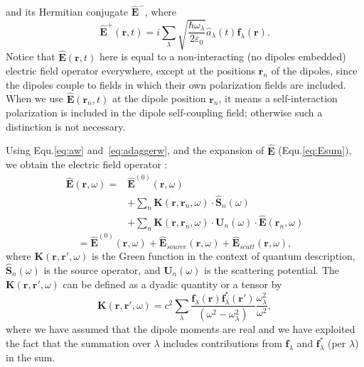 and its Hermitian conjugate $\mathbf{\hat{E}}^-$, where
\begin{equation}
 \label{eq:E^plus}
 \mathbf{\hat{E}}^+(\mathbf{r},t)=i\sum_\lambda\sqrt{\frac{\hbar\omega_\lambda}{2\varepsilon_0}}\hat{a}_\lambda(t)\mathbf{f}_\lambda(\mathbf{r}).
\end{equation}
Notice that $\mathbf{\hat{E}}(\mathbf{r},t)$ here is equal to a non-interacting (no dipoles embedded) electric field operator everywhere, except at the positions $\mathbf{r}_n$ of the dipoles,
since the dipoles couple to fields in which their own polarization fields are included.
When we use $\mathbf{\hat{E}}(\mathbf{r}_n,t)$ at the dipole position $\mathbf{r}_n$,
it means a self-interaction polarization is included in the dipole self-coupling field; otherwise such a distinction is not necessary.


Using  Equ.\eqref{eq:aw} and~\eqref{eq:adaggerw}, and the expansion of $\mathbf{\hat{E}}$ (Equ.\eqref{eq:Esum}),
we obtain the electric field operator \cite{Wubs2004}:
%
\begin{subequations}
\label{eq:ew1_1}
\begin{align}
\mathbf{\hat{E}}(\mathbf{r},\omega) =& \mathbf{\hat{E}}^{(0)}(\mathbf{r},\omega)\label{bareE0_1}\\
&+ \sum_n{\mathbf{K}(\mathbf{r},\mathbf{r}_n,\omega)\cdot\hat{\mathbf{S}}_n(\omega)}\label{sourceE_1}\\
&+ \sum_n{\mathbf{K}(\mathbf{r},\mathbf{r}_n,\omega)\cdot\mathbf{U}_n(\omega)\cdot\mathbf{\hat{E}}(\mathbf{r}_n,\omega)}\label{scatteringE_1}
\end{align}
\end{subequations}
%
\begin{equation}
 =\mathbf{\hat{E}}^{(0)}(\mathbf{r},\omega)+ \mathbf{\hat{E}}_{source}(\mathbf{r},\omega)+\mathbf{\hat{E}}_{scatt}(\mathbf{r},\omega)\label{eq:E0sourcescatt_1},
\end{equation}
where $\mathbf{K}(\mathbf{r},\mathbf{r}',\omega)$ is the Green function in the context of quantum description, $\hat{\mathbf{S}}_n(\omega)$ is the source operator, and $\mathbf{U}_n(\omega)$ is the scattering potential. The $\mathbf{K}(\mathbf{r},\mathbf{r}',\omega)$ can be defined as a dyadic quantity or a tensor by
\begin{equation}
 \label{K}
 \mathbf{K}(\mathbf{r},\mathbf{r}',\omega)=c^2\sum_\lambda\frac{\mathbf{f}_\lambda(\mathbf{r})\mathbf{f}_\lambda^*(\mathbf{r}')}
{(\omega^2-\omega_\lambda^2)}\frac{\omega_\lambda^2}{\omega^2},
\end{equation}
where we have assumed that the dipole moments are real and  we
have exploited the fact that the summation over $\lambda$ includes
contributions from $\mathbf{f}_\lambda$ and $\mathbf{f}_\lambda^*$ (per $\lambda$)
in the sum.

